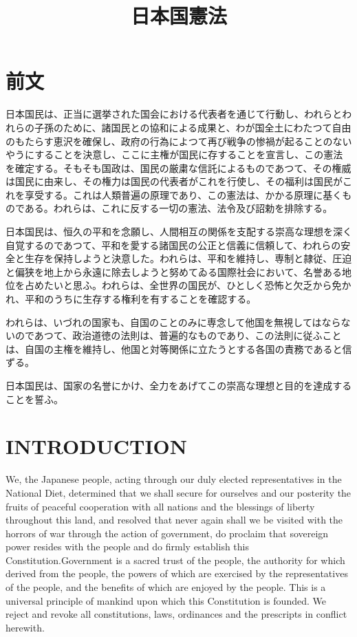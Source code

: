 \documentclass[twocolumn]{jsarticle}
\begin{document}
\title{日本国憲法}
\author{}
\date{}
\maketitle

\section*{前文}

日本国民は、正当に選挙された国会における代表者を通じて行動し、われらとわれらの子孫のために、諸国民との協和による成果と、わが国全土にわたつて自由のもたらす恵沢を確保し、政府の行為によつて再び戦争の惨禍が起ることのないやうにすることを決意し、ここに主権が国民に存することを宣言し、この憲法を確定する。そもそも国政は、国民の厳粛な信託によるものであつて、その権威は国民に由来し、その権力は国民の代表者がこれを行使し、その福利は国民がこれを享受する。これは人類普遍の原理であり、この憲法は、かかる原理に基くものである。われらは、これに反する一切の憲法、法令及び詔勅を排除する。

日本国民は、恒久の平和を念願し、人間相互の関係を支配する崇高な理想を深く自覚するのであつて、平和を愛する諸国民の公正と信義に信頼して、われらの安全と生存を保持しようと決意した。われらは、平和を維持し、専制と隷従、圧迫と偏狭を地上から永遠に除去しようと努めてゐる国際社会において、名誉ある地位を占めたいと思ふ。われらは、全世界の国民が、ひとしく恐怖と欠乏から免かれ、平和のうちに生存する権利を有することを確認する。

われらは、いづれの国家も、自国のことのみに専念して他国を無視してはならないのであつて、政治道徳の法則は、普遍的なものであり、この法則に従ふことは、自国の主権を維持し、他国と対等関係に立たうとする各国の責務であると信ずる。

日本国民は、国家の名誉にかけ、全力をあげてこの崇高な理想と目的を達成することを誓ふ。

\newpage

\section*{INTRODUCTION}

We, the Japanese people, acting through our duly elected representatives in the National Diet, determined that we shall secure for ourselves and our posterity the fruits of peaceful cooperation with all nations and the blessings of liberty throughout this land, and resolved that never again shall we be visited with the horrors of war through the action of government, do proclaim that sovereign power resides with the people and do firmly establish this Constitution.Government is a sacred trust of the people, the authority for which derived from the people, the powers of which are exercised by the representatives of the people, and the benefits of which are enjoyed by the people. This is a universal principle of mankind upon which this Constitution is founded. We reject and revoke all constitutions, laws, ordinances and the prescripts in conflict herewith.
\end{document}
